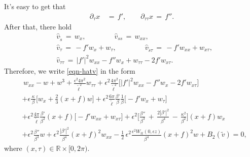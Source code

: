 \documentclass[10pt, reqno]{amsart}
\numberwithin{equation}{section}
\theoremstyle{definition}
\def\p{\partial}
\begin{document}
{It's easy to get that
\begin{align*}
\p_\tau x & \,=\, f',
\qquad
\p_{\tau\tau} x \,=\, f''.
\end{align*}
After that, there hold
\begin{align*}
&{\hat v}_{{\tilde s}} \,=\, w_x,
\qquad\qquad
{\hat v}_{ss} \,=\, w_{xx},
\\[2mm]
&{\hat v}_\tau \,=\, - f' w_x +w_\tau,
\qquad\qquad
{\hat v}_{{\tilde s}\tau} \,=\, - f' w_{xx} +w_{x\tau},
\\[2mm]
&{\hat v}_{\tau\tau} \,=\, |f'|^2 w_{xx} -f''w_x +w_{\tau\tau} -2f' w_{x\tau}.
\end{align*}
Therefore, we write \eqref{eqn-hatv} in the form
\begin{align}
&\, w_{xx} - w + w^3
+ \frac{\epsilon^2 4\pi^2}{{\tilde\ell}^2} w_{\tau\tau}
+\epsilon^2\frac{4\pi^2}{{\tilde\ell}^2}\Big[|f'|^2 w_{xx} -f''w_x -2f' w_{x\tau}\Big]
\nonumber\\[2mm]
&
+\epsilon \frac{\kappa}{\, \beta\, } \Big[ w_x +\frac{2}{3} (x+f)w\Big]
+\epsilon^2\frac{6\pi}{{\tilde\ell}}\frac{\beta'} {\beta}\frac{1}{\beta}\big[- f' w_{x} +w_{\tau}\big]
\nonumber\\[2mm]
&
+ \epsilon^2 \frac{4\pi}{{\tilde\ell}} \frac{\beta'}{\beta^2} (x+f)\big[- f' w_{xx} +w_{x\tau}\big]
+
\epsilon^2\Big[\frac{\beta''}{\beta^3}\,+\,\frac{2|\beta'|^2}{\beta^4} \,-\,\frac{\kappa^2}{\beta^2} \Big](x+f) w_{x}
\nonumber\\[2mm]
&+\epsilon^2\frac{\beta''}{\beta^3}w
+ \epsilon^2 \frac{|\beta'|^2}{\beta^4}(x+f)^2 w_{xx}
-\frac{1}{2}\, \epsilon^2\frac{\epsilon^2W_{tt}(0, \epsilon z)}{\beta^4} (x+f)^2 w
+B_2 ({\tilde v})
=0,
\label{S(w)}
\end{align}
where $(x, \tau)\in{\mathbb R}\times[0, 2\pi)$.

}
\end{document}
